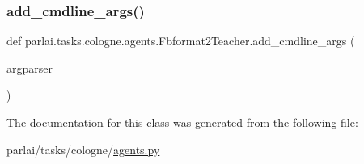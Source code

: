 \subsubsection{\texorpdfstring{add\+\_\+cmdline\+\_\+args()}{add\_cmdline\_args()}}
{\footnotesize\ttfamily def parlai.\+tasks.\+cologne.\+agents.\+Fbformat2\+Teacher.\+add\+\_\+cmdline\+\_\+args (\begin{DoxyParamCaption}\item[{}]{argparser }\end{DoxyParamCaption})\hspace{0.3cm}{\ttfamily [static]}}



The documentation for this class was generated from the following file\+:\begin{DoxyCompactItemize}
\item 
parlai/tasks/cologne/\hyperlink{parlai_2tasks_2cologne_2agents_8py}{agents.\+py}\end{DoxyCompactItemize}
